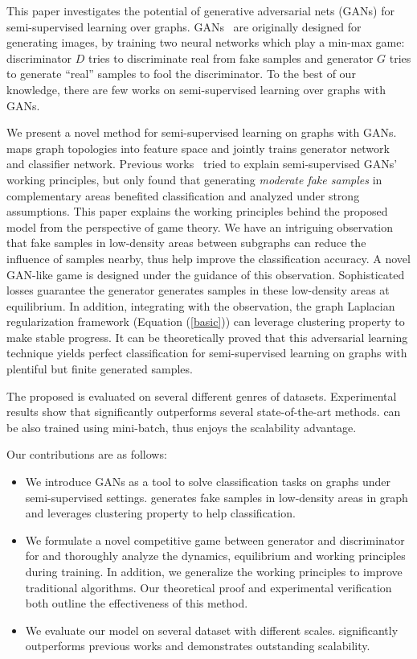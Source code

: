 This paper investigates the potential of generative adversarial nets (GANs) for  semi-supervised learning over graphs.
GANs~\cite{goodfellow2014generative} are originally designed for generating images, by training two neural networks which play a min-max game: discriminator $D$ tries to discriminate real from fake samples and generator $G$ tries to generate ``real'' samples to fool the discriminator. 
To the best of our knowledge, there are few works on semi-supervised learning over graphs with GANs.

We present a novel method \smodel for semi-supervised learning on graphs with GANs.
\smodel
maps graph topologies into feature space and jointly trains generator network and classifier network. 
Previous works~\cite{dai2017good,kumar2017semi} tried to explain semi-supervised GANs' working principles, but only found that generating {\it moderate fake samples} in complementary areas benefited classification and analyzed under strong assumptions. 
This paper explains the working principles behind the proposed model from the perspective of game theory.
We have an intriguing observation that 
fake samples in low-density areas between subgraphs
can reduce the influence of samples nearby, thus help improve the classification accuracy. 
A novel GAN-like game is designed under the guidance of this observation. Sophisticated losses guarantee the generator generates samples in these low-density areas at equilibrium. 
In addition, integrating with the observation, the
graph Laplacian regularization framework (Equation (\ref{basic})) can leverage clustering property to make stable progress.
It can be theoretically proved that this adversarial learning technique yields perfect classification for semi-supervised learning on graphs with plentiful but finite generated samples. 

The proposed \smodel is evaluated on several different genres of datasets. Experimental results show that \smodel significantly outperforms several state-of-the-art methods. \smodel can be also trained using mini-batch, thus enjoys the scalability advantage. 

Our contributions are as follows:
\begin{itemize}
\item We introduce GANs as a tool to solve classification tasks on graphs under semi-supervised settings. \smodel generates fake samples in low-density areas in graph and leverages clustering property to help classification. 

\item We formulate a novel competitive game between generator and discriminator for \smodel and thoroughly analyze the dynamics, equilibrium and working principles during training. In addition, we generalize the working principles to improve traditional algorithms. Our theoretical proof and experimental verification both outline the effectiveness of this method.  

\item We evaluate our model on several dataset with different scales. \smodel significantly outperforms previous works and demonstrates outstanding scalability.
\end{itemize}

